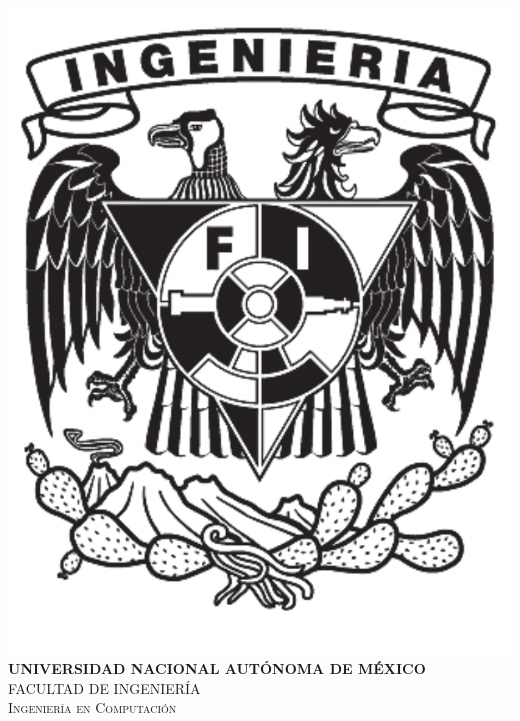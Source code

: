 \documentclass[12pt, a4paper]{article}
\begin{document}
\begin{titlepage}
		\includegraphics[scale = .32]{img/fi.png}\\[.65cm] %
		
		\textsc{\large \bfseries UNIVERSIDAD NACIONAL AUTÓNOMA DE MÉXICO}\\[.5cm] %
		\textsc{\large FACULTAD DE INGENIERÍA}\\[0.5cm] %
		\textsc{\large Ingeniería en Computación}\\[1.4 cm] %
		

\end{titlepage}
\end{document}
